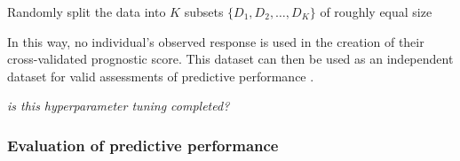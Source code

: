 \documentclass[11pt,a4paper]{article}
\let\cite\parencite
\begin{document}
\begin{algorithm}[H]
\DontPrintSemicolon
\SetAlgoLined
{}

\BlankLine
Randomly split the data into $K$ subsets $\{D_1, D_2, \dots, D_K\}$ of roughly equal size\;

\caption{Pre-validation Procedure}
\end{algorithm}

\noindent In this way, no individual's observed response is used in the creation of their cross-validated prognostic score. This dataset can then be used as an independent dataset for valid assessments of predictive performance \cite{TibshiraniEfron2002}.

\textit{is this hyperparameter tuning completed?}


\subsubsection{Evaluation of predictive performance}
\end{document}
